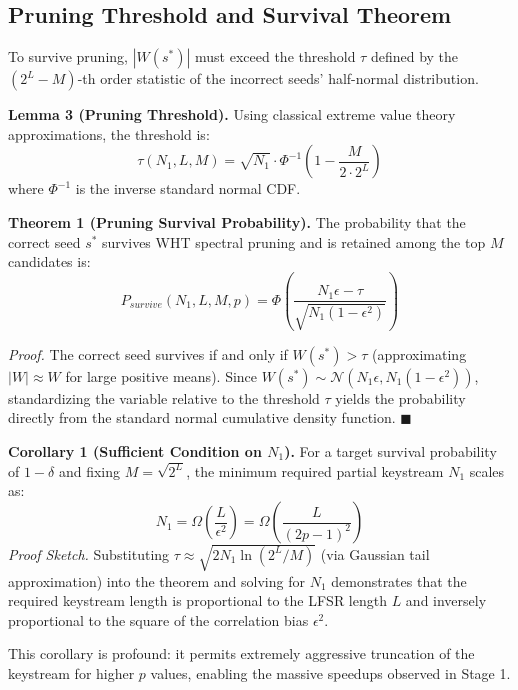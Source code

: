 \subsection{Pruning Threshold and Survival Theorem}
To survive pruning, $|W(s^*)|$ must exceed the threshold $\tau$ defined by the $(2^L - M)$-th order statistic of the incorrect seeds' half-normal distribution.

\textbf{Lemma 3 (Pruning Threshold).} Using classical extreme value theory approximations, the threshold is:
\begin{equation}
    \tau(N_1, L, M) = \sqrt{N_1} \cdot \Phi^{-1}\left(1 - \frac{M}{2 \cdot 2^L}\right)
\end{equation}
where $\Phi^{-1}$ is the inverse standard normal CDF.

\textbf{Theorem 1 (Pruning Survival Probability).} The probability that the correct seed $s^*$ survives WHT spectral pruning and is retained among the top $M$ candidates is:
\begin{equation}
    P_{survive}(N_1, L, M, p) = \Phi\left( \frac{N_1 \epsilon - \tau}{\sqrt{N_1(1-\epsilon^2)}} \right)
\end{equation}

\textit{Proof.} The correct seed survives if and only if $W(s^*) > \tau$ (approximating $|W| \approx W$ for large positive means). Since $W(s^*) \sim \mathcal{N}\left(N_1 \epsilon, N_1(1-\epsilon^2)\right)$, standardizing the variable relative to the threshold $\tau$ yields the probability directly from the standard normal cumulative density function. $\blacksquare$

\textbf{Corollary 1 (Sufficient Condition on $N_1$).} For a target survival probability of $1 - \delta$ and fixing $M = \sqrt{2^L}$, the minimum required partial keystream $N_1$ scales as:
\begin{equation}
    N_1 = \Omega\left( \frac{L}{\epsilon^2} \right) = \Omega\left( \frac{L}{(2p-1)^2} \right)
\end{equation}
\textit{Proof Sketch.} Substituting $\tau \approx \sqrt{2 N_1 \ln(2^L/M)}$ (via Gaussian tail approximation) into the theorem and solving for $N_1$ demonstrates that the required keystream length is proportional to the LFSR length $L$ and inversely proportional to the square of the correlation bias $\epsilon^2$.

This corollary is profound: it permits extremely aggressive truncation of the keystream for higher $p$ values, enabling the massive speedups observed in Stage 1.

